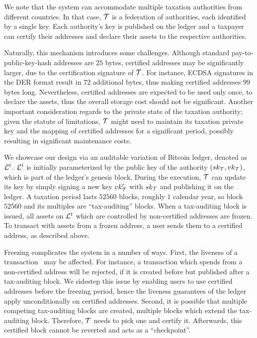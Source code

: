 We note that the system can accommodate multiple taxation authorities from
different countries. In that case, $\mathcal{T}$ is a federation of authorities,
each identified by a single key. Each authority's key is published on the
ledger and a taxpayer can certify their addresses and declare their assets to
the respective authorities.

Naturally, this mechanism introduces some challenges. Although standard
pay-to-public-key-hash addresses are $25$ bytes, certified addresses may be
significantly larger, due to the certification signature of $\mathcal{T}$. For
instance, ECDSA signatures in the DER format result in $72$ additional bytes,
thus making certified addresses $99$ bytes long. Nevertheless, certified
addresses are expected to be used only once, to declare the assets, thus the
overall storage cost should not be significant. Another important consideration
regards to the private state of the taxation authority; given the statute of
limitations, $\mathcal{T}$ might need to maintain its taxation private key and the
mapping of certified addresses for a significant period,
possibly resulting in significant maintenance costs.

We showcase our design via an auditable variation of Bitcoin ledger, denoted as
$\mathcal{L}^{t}$. $\mathcal{L}^{t}$ is initially parameterized by the public key of the
authority $(sk_{\mathcal{T}}, vk_{\mathcal{T}})$, which is
part of the ledger's genesis block. During the execution, $\mathcal{T}$ can update
its key by simply signing a new key $vk_{\mathcal{T}}'$ with
$sk_{\mathcal{T}}$ and publishing it on the ledger. A taxation period lasts
$52560$ blocks, \ie roughly $1$ calendar year, so block $52560$ and its
multiples are ``tax-auditing'' blocks.  When a tax-auditing block is issued,
all assets on $\mathcal{L}^{t}$ which are controlled by non-certified addresses are
frozen. To transact with assets from a frozen address, a user sends them to a
certified address, as described above.

Freezing complicates the system in a number of ways. First, the liveness
of a transaction~\cite{EC:GarKiaLeo15} may be affected. For
instance, a transaction which spends from a non-certified address will be
rejected, if it is created before but published after a tax-auditing block. We
sidestep this issue by enabling users to use certified addresses before the
freezing period, hence the liveness guarantees of the ledger apply
unconditionally on certified addresses. Second, it is possible that multiple
competing tax-auditing blocks are created, \eg multiple blocks which extend the
tax-auditing block. Therefore, $\mathcal{T}$ needs to pick one and certify it.
Afterwards, this certified block cannot be reverted and acts as a
``checkpoint''.


